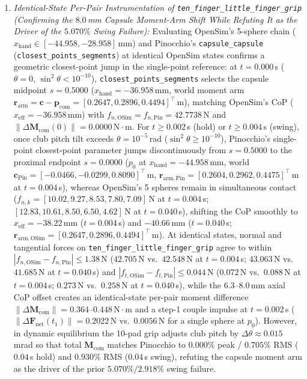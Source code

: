 \documentclass[11pt,a4paper]{article}
\begin{document}
\begin{enumerate}[leftmargin=*,noitemsep]
\item \textit{Identical-State Per-Pair Instrumentation of \texttt{ten\_finger\_little\_finger\_grip} (Confirming the $8.0$\,mm Capsule Moment-Arm Shift While Refuting It as the Driver of the $5.070\%$ Swing Failure):} Evaluating OpenSim's 5-sphere chain ($x_{\mathrm{hand}} \in [-44.958, -28.958]$\,mm) and Pinocchio's \texttt{capsule\_capsule} (\texttt{closest\_points\_segments}) at identical OpenSim states confirms a geometric closest-point jump in the single-point reference: at $t = 0.000$\,s ($\theta = 0$, $\sin^2\theta < 10^{-10}$), \texttt{closest\_points\_segments} selects the capsule midpoint $s = 0.5000$ ($x_{\mathrm{hand}} = -36.958$\,mm, world moment arm $\mathbf{r}_{\mathrm{arm}} = \mathbf{c} - \mathbf{p}_{\mathrm{com}} = [0.2647, 0.2896, 0.4494]^{\top}$\,m), matching OpenSim's CoP ($x_{\mathrm{eff}} = -36.958$\,mm) with $f_{n,\mathrm{OSim}} = f_{n,\mathrm{Pin}} = 42.7738$\,N and $\|\Delta\mathbf{M}_{\mathrm{com}}(0)\| = 0.0000\,\mathrm{N\cdot m}$. For $t \ge 0.002$\,s (hold) or $t \ge 0.004$\,s (swing), once club pitch tilt exceeds $\theta = 10^{-5}$\,rad ($\sin^2\theta \ge 10^{-10}$), Pinocchio's single-point closest-point parameter jumps discontinuously from $s = 0.5000$ to the proximal endpoint $s = 0.0000$ ($p_0$ at $x_{\mathrm{hand}} = -44.958$\,mm, world $\mathbf{c}_{\mathrm{Pin}} = [-0.0466, -0.0299, 0.8090]^{\top}$\,m, $\mathbf{r}_{\mathrm{arm,Pin}} = [0.2604, 0.2962, 0.4475]^{\top}$\,m at $t = 0.004$\,s), whereas OpenSim's 5 spheres remain in simultaneous contact ($f_{n,k} = [10.02, 9.27, 8.53, 7.80, 7.09]$\,N at $t = 0.004$\,s; $[12.83, 10.61, 8.50, 6.50, 4.62]$\,N at $t = 0.040$\,s), shifting the CoP smoothly to $x_{\mathrm{eff}} = -38.22$\,mm ($t = 0.004$\,s) and $-40.66$\,mm ($t = 0.040$\,s; $\mathbf{r}_{\mathrm{arm,OSim}} = [0.2647, 0.2896, 0.4494]^{\top}$\,m). At identical states, normal and tangential forces on \texttt{ten\_finger\_little\_finger\_grip} agree to within $|f_{n,\mathrm{OSim}} - f_{n,\mathrm{Pin}}| \le 1.38$\,N ($42.705$\,N vs.\ $42.548$\,N at $t = 0.004$\,s; $43.063$\,N vs.\ $41.685$\,N at $t = 0.040$\,s) and $|f_{t,\mathrm{OSim}} - f_{t,\mathrm{Pin}}| \le 0.044$\,N ($0.072$\,N vs.\ $0.088$\,N at $t = 0.004$\,s; $0.273$\,N vs.\ $0.258$\,N at $t = 0.040$\,s), while the $6.3\text{--}8.0$\,mm axial CoP offset creates an identical-state per-pair moment difference $\|\Delta\mathbf{M}_{\mathrm{com}}\| = 0.364\text{--}0.448\,\mathrm{N\cdot m}$ and a step-1 couple impulse at $t = 0.002$\,s ($\|\Delta\mathbf{F}_{\mathrm{net}}(t_1)\| = 0.2022$\,N vs.\ $0.0056$\,N for a single sphere at $p_0$). However, in dynamic equilibrium the 10-pad grip adjusts club pitch by $\Delta\theta \approx 0.015$\,mrad so that total $\mathbf{M}_{\mathrm{com}}$ matches Pinocchio to $\mathbf{0.000\%}$ peak / $\mathbf{0.705\%}$ RMS ($0.04$\,s hold) and $\mathbf{0.930\%}$ RMS ($0.04$\,s swing), refuting the capsule moment arm as the driver of the prior $5.070\% / 2.918\%$ swing failure.
\end{enumerate}
\end{document}
